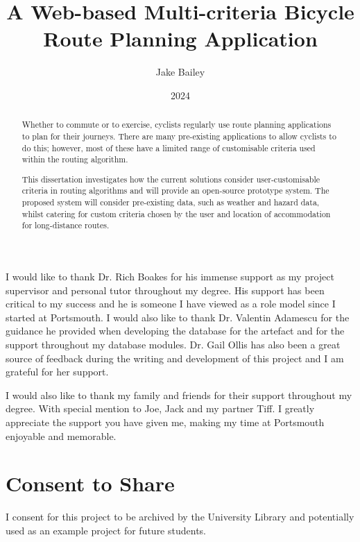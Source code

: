 \documentclass[bsc]{abdnthesis}
\title{A Web-based Multi-criteria Bicycle Route Planning Application}
\author{Jake Bailey}
\date{2024}
\begin{document}

\maketitle
\makedeclaration


\begin{abstract}
    Whether to commute or to exercise, cyclists regularly use route planning applications to plan for their journeys. There are many pre-existing applications to allow cyclists to do this; however, most of these have a limited range of customisable criteria used within the routing algorithm.

    This dissertation investigates how the current solutions consider user-customisable criteria in routing algorithms and will provide an open-source prototype system. The proposed system will consider pre-existing data, such as weather and hazard data, whilst catering for custom criteria chosen by the user and location of accommodation for long-distance routes.
\end{abstract}

\begin{acknowledgements}
  I would like to thank Dr. Rich Boakes for his immense support as my project supervisor and personal tutor throughout my degree. His support has been critical to my success and he is someone I have viewed as a role model since I started at Portsmouth. I would also like to thank Dr. Valentin Adamescu for the guidance he provided when developing the database for the artefact and for the support throughout my database modules. Dr. Gail Ollis has also been a great source of feedback during the writing and development of this project and I am grateful for her support.

  I would also like to thank my family and friends for their support throughout my degree. With special mention to Joe, Jack and my partner Tiff. I greatly appreciate the support you have given me, making my time at Portsmouth enjoyable and memorable.
\end{acknowledgements}

\section*{Consent to Share}
I consent for this project to be archived by the University Library and potentially used as an example project for future students.
\end{document}
